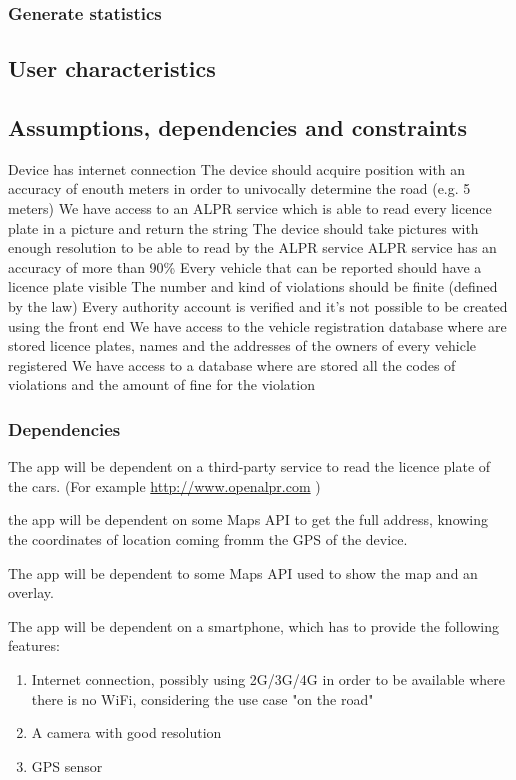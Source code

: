 \subsubsection{Generate statistics}

\subsection{User characteristics }

\subsection{Assumptions, dependencies and constraints}
\begin{enumerate}
  Device has internet connection
 The device should acquire position with an accuracy of enouth meters in order to univocally determine the road (e.g. 5 meters)
\dom{} We have access to an ALPR service which is able to read every licence plate in a picture and return the string
 The device should take pictures with enough resolution to be able to read by the ALPR service
 ALPR service has an accuracy of more than 90\%
 Every vehicle that can be reported should have a licence plate visible
 The number and kind of violations should be finite (defined by the law)
 Every authority account is verified and it's not possible to be created using the front end
 We have access to the vehicle registration database where are stored licence plates, names and the addresses of the owners of every vehicle registered
 We have access to a database where are stored all the codes of violations and the amount of fine for the violation

\end{enumerate}

\subsubsection{Dependencies} \label{Dependencies}

The app will be dependent on a third-party service to read the licence plate of the cars. (For example \url{http://www.openalpr.com} )

the app will be dependent on some Maps API to get the full address, knowing the coordinates of location coming fromm the GPS of the device.

The app will be dependent to some Maps API used to show the map and an overlay.



The app will be dependent on a smartphone, which has to provide the following features:
\begin{enumerate}
  \item Internet connection, possibly using 2G/3G/4G in order to be available where there is no WiFi, considering the use case "on the road"
  \item A camera with good resolution
  \item GPS sensor
\end{enumerate}
